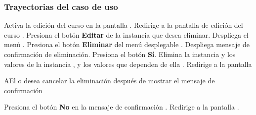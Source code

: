 \subsubsection{Trayectorias del caso de uso}

\begin{UCtrayectoria}%
%

    \Actor Activa la edición del curso en la pantalla .
    \Sistema Redirige a la pantalla de edición del curso .
    \Actor Presiona el botón {\bf Editar} de la instancia que desea eliminar.
    \Sistema Despliega el menú .
    \Actor Presiona el botón {\bf Eliminar} del menú desplegable .
    \Sistema Despliega mensaje de confirmación de eliminación. 
    \Actor Presiona el botón {\bf Sí}. 
    \Sistema  Elimina la instancia y los valores de la instancia , y los valores que dependen de ella .
    \Sistema Redirige a la pantalla 

\end{UCtrayectoria}

\begin{UCtrayectoriaA}{A}{El  o  desea cancelar la eliminación después de mostrar el mensaje de confirmación}

  \Actor Presiona el botón {\bf No} en la mensaje de confirmación .
  \Sistema Redirige a la pantalla .

\end{UCtrayectoriaA}
